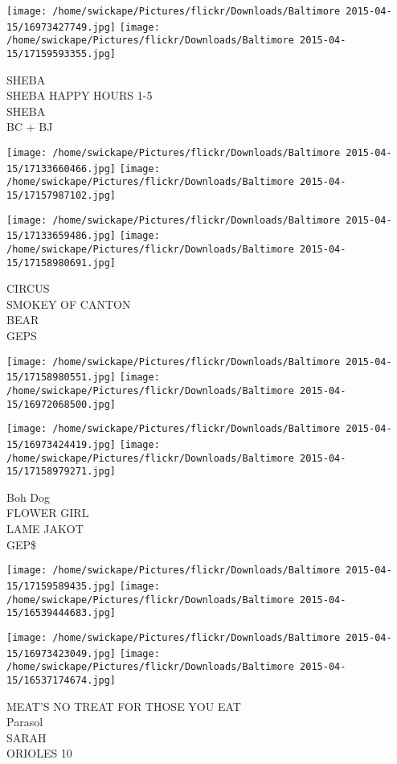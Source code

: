 \documentclass[10pt,letterpaper]{article}
\begin{document}
\texttt{[image: /home/swickape/Pictures/flickr/Downloads/Baltimore 2015-04-15/16973427749.jpg]}
\texttt{[image: /home/swickape/Pictures/flickr/Downloads/Baltimore 2015-04-15/17159593355.jpg]}

SHEBA\\
SHEBA HAPPY HOURS 1{-}5\\
SHEBA\\
BC + BJ
\pagebreak

\texttt{[image: /home/swickape/Pictures/flickr/Downloads/Baltimore 2015-04-15/17133660466.jpg]}
\texttt{[image: /home/swickape/Pictures/flickr/Downloads/Baltimore 2015-04-15/17157987102.jpg]}

\texttt{[image: /home/swickape/Pictures/flickr/Downloads/Baltimore 2015-04-15/17133659486.jpg]}
\texttt{[image: /home/swickape/Pictures/flickr/Downloads/Baltimore 2015-04-15/17158980691.jpg]}

CIRCUS\\
SMOKEY OF CANTON\\
BEAR\\
GEPS
\pagebreak

\texttt{[image: /home/swickape/Pictures/flickr/Downloads/Baltimore 2015-04-15/17158980551.jpg]}
\texttt{[image: /home/swickape/Pictures/flickr/Downloads/Baltimore 2015-04-15/16972068500.jpg]}

\texttt{[image: /home/swickape/Pictures/flickr/Downloads/Baltimore 2015-04-15/16973424419.jpg]}
\texttt{[image: /home/swickape/Pictures/flickr/Downloads/Baltimore 2015-04-15/17158979271.jpg]}

Boh Dog\\
FLOWER GIRL\\
LAME JAKOT\\
GEP\$
\pagebreak

\texttt{[image: /home/swickape/Pictures/flickr/Downloads/Baltimore 2015-04-15/17159589435.jpg]}
\texttt{[image: /home/swickape/Pictures/flickr/Downloads/Baltimore 2015-04-15/16539444683.jpg]}

\texttt{[image: /home/swickape/Pictures/flickr/Downloads/Baltimore 2015-04-15/16973423049.jpg]}
\texttt{[image: /home/swickape/Pictures/flickr/Downloads/Baltimore 2015-04-15/16537174674.jpg]}

MEAT'S NO TREAT FOR THOSE YOU EAT\\
Parasol\\
SARAH\\
ORIOLES 10
\pagebreak
\end{document}
